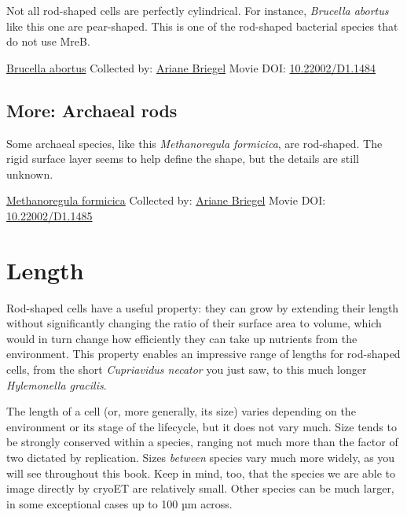 \documentclass[]{tufte-book}
\begin{document}
Not all rod-shaped cells are perfectly cylindrical. For instance, \emph{Brucella abortus} like this one are pear-shaped. This is one of the rod-shaped bacterial species that do not use MreB.



\hypertarget{htmlwidget-df2ecb0bbc5ae9afe9c7}{}

\label{fig:3-2a}\protect\hyperlink{tree}{Brucella abortus} Collected by: \protect\hyperlink{ariane_briegel}{Ariane Briegel} Movie DOI: \href{https://doi.org/10.22002/D1.1484}{10.22002/D1.1484}

\hypertarget{Archaeal_rods}{%
\subsection*{More: Archaeal rods}\label{Archaeal_rods}}

Some archaeal species, like this \emph{Methanoregula formicica}, are rod-shaped. The rigid surface layer seems to help define the shape, but the details are still unknown.



\hypertarget{htmlwidget-705d37f18a7e6509e086}{}

\label{fig:3-2b}\protect\hyperlink{tree}{Methanoregula formicica} Collected by: \protect\hyperlink{ariane_briegel}{Ariane Briegel} Movie DOI: \href{https://doi.org/10.22002/D1.1485}{10.22002/D1.1485}

\hypertarget{length}{%
\section{Length}\label{length}}

Rod-shaped cells have a useful property: they can grow by extending their length without significantly changing the ratio of their surface area to volume, which would in turn change how efficiently they can take up nutrients from the environment. This property enables an impressive range of lengths for rod-shaped cells, from the short \emph{Cupriavidus necator} you just saw, to this much longer \emph{Hylemonella gracilis}.

The length of a cell (or, more generally, its size) varies depending on the environment or its stage of the lifecycle, but it does not vary much. Size tends to be strongly conserved within a species, ranging not much more than the factor of two dictated by replication. Sizes \emph{between} species vary much more widely, as you will see throughout this book. Keep in mind, too, that the species we are able to image directly by cryoET are relatively small. Other species can be much larger, in some exceptional cases up to 100 µm across.
\end{document}
